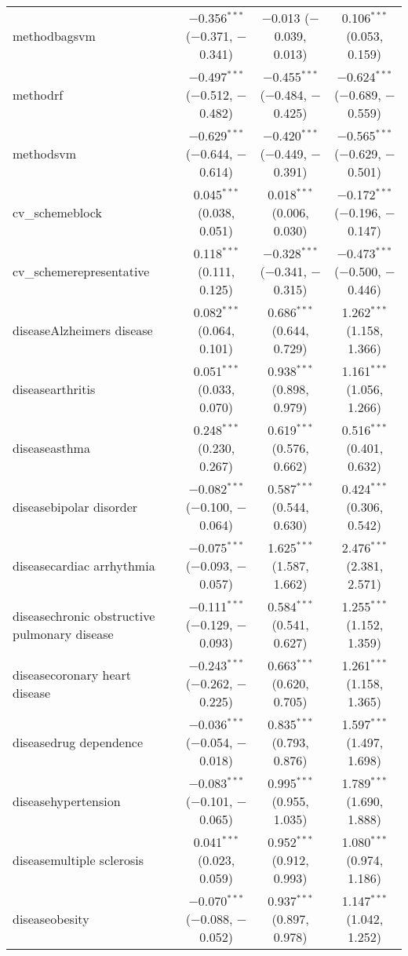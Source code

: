 \begin{table}[!htbp]
\begin{tabular}{@{\extracolsep{5pt}}lccc}
  methodbagsvm & $-$0.356$^{***}$ ($-$0.371, $-$0.341) & $-$0.013 ($-$0.039, 0.013) & 0.106$^{***}$ (0.053, 0.159) \\ 
  methodrf & $-$0.497$^{***}$ ($-$0.512, $-$0.482) & $-$0.455$^{***}$ ($-$0.484, $-$0.425) & $-$0.624$^{***}$ ($-$0.689, $-$0.559) \\ 
  methodsvm & $-$0.629$^{***}$ ($-$0.644, $-$0.614) & $-$0.420$^{***}$ ($-$0.449, $-$0.391) & $-$0.565$^{***}$ ($-$0.629, $-$0.501) \\ 
  cv\_schemeblock & 0.045$^{***}$ (0.038, 0.051) & 0.018$^{***}$ (0.006, 0.030) & $-$0.172$^{***}$ ($-$0.196, $-$0.147) \\ 
  cv\_schemerepresentative & 0.118$^{***}$ (0.111, 0.125) & $-$0.328$^{***}$ ($-$0.341, $-$0.315) & $-$0.473$^{***}$ ($-$0.500, $-$0.446) \\ 
  diseaseAlzheimers disease & 0.082$^{***}$ (0.064, 0.101) & 0.686$^{***}$ (0.644, 0.729) & 1.262$^{***}$ (1.158, 1.366) \\ 
  diseasearthritis & 0.051$^{***}$ (0.033, 0.070) & 0.938$^{***}$ (0.898, 0.979) & 1.161$^{***}$ (1.056, 1.266) \\ 
  diseaseasthma & 0.248$^{***}$ (0.230, 0.267) & 0.619$^{***}$ (0.576, 0.662) & 0.516$^{***}$ (0.401, 0.632) \\ 
  diseasebipolar disorder & $-$0.082$^{***}$ ($-$0.100, $-$0.064) & 0.587$^{***}$ (0.544, 0.630) & 0.424$^{***}$ (0.306, 0.542) \\ 
  diseasecardiac arrhythmia & $-$0.075$^{***}$ ($-$0.093, $-$0.057) & 1.625$^{***}$ (1.587, 1.662) & 2.476$^{***}$ (2.381, 2.571) \\ 
  diseasechronic obstructive pulmonary disease & $-$0.111$^{***}$ ($-$0.129, $-$0.093) & 0.584$^{***}$ (0.541, 0.627) & 1.255$^{***}$ (1.152, 1.359) \\ 
  diseasecoronary heart disease & $-$0.243$^{***}$ ($-$0.262, $-$0.225) & 0.663$^{***}$ (0.620, 0.705) & 1.261$^{***}$ (1.158, 1.365) \\ 
  diseasedrug dependence & $-$0.036$^{***}$ ($-$0.054, $-$0.018) & 0.835$^{***}$ (0.793, 0.876) & 1.597$^{***}$ (1.497, 1.698) \\ 
  diseasehypertension & $-$0.083$^{***}$ ($-$0.101, $-$0.065) & 0.995$^{***}$ (0.955, 1.035) & 1.789$^{***}$ (1.690, 1.888) \\ 
  diseasemultiple sclerosis & 0.041$^{***}$ (0.023, 0.059) & 0.952$^{***}$ (0.912, 0.993) & 1.080$^{***}$ (0.974, 1.186) \\ 
  diseaseobesity & $-$0.070$^{***}$ ($-$0.088, $-$0.052) & 0.937$^{***}$ (0.897, 0.978) & 1.147$^{***}$ (1.042, 1.252) \\ 

\end{tabular}
\end{table}
